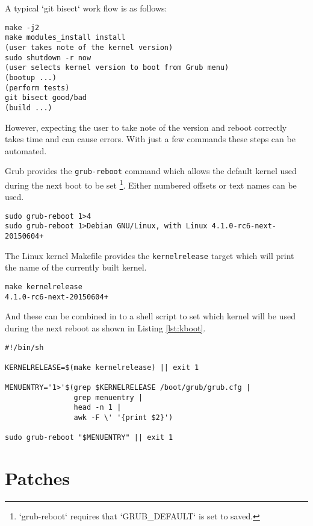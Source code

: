 \documentclass{article}
\begin{document}
A typical `git bisect` work flow is as follows:

\begin{verbatim}
make -j2
make modules_install install
(user takes note of the kernel version)
sudo shutdown -r now
(user selects kernel version to boot from Grub menu)
(bootup ...)
(perform tests)
git bisect good/bad
(build ...)
\end{verbatim}

However, expecting the user to take note of the version and reboot
correctly takes time and can cause errors.  With just a
few commands these steps can be automated.

Grub provides the \verb+grub-reboot+ command which allows the default
kernel used during the next boot to be set
\footnote{`grub-reboot` requires that `GRUB\_DEFAULT` is set to saved.}.
Either numbered offsets or text names can be used.

\begin{verbatim}
sudo grub-reboot 1>4
sudo grub-reboot 1>Debian GNU/Linux, with Linux 4.1.0-rc6-next-20150604+
\end{verbatim}

The Linux kernel Makefile provides the \verb+kernelrelease+ target which
will print the name of the currently built kernel.

\begin{verbatim}
make kernelrelease
4.1.0-rc6-next-20150604+
\end{verbatim}

And these can be combined in to a shell script to set which kernel
will be used during the next reboot as shown in Listing
\ref{lst:kboot}.

\begin{minipage}{\linewidth}
\begin{lstlisting}[label=lst:kboot, caption="Script to set next kernel
to boot."]
#!/bin/sh

KERNELRELEASE=$(make kernelrelease) || exit 1

MENUENTRY='1>'$(grep $KERNELRELEASE /boot/grub/grub.cfg |
				grep menuentry |
				head -n 1 |
				awk -F \' '{print $2}')

sudo grub-reboot "$MENUENTRY" || exit 1
\end{lstlisting}
\end{minipage}

\section{Patches}
\end{document}
